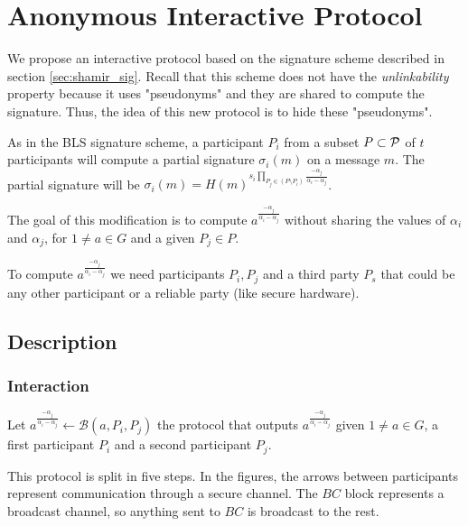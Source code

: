 \section{Anonymous Interactive Protocol}

We propose an interactive protocol based on the signature scheme described in section \ref{sec:shamir_sig}. Recall that this scheme does not have the \textit{unlinkability} property because it uses "pseudonyms" and they are shared to compute the signature. Thus, the idea of this new protocol is to hide these "pseudonyms".

As in the BLS signature scheme, a participant $P_i$ from a subset $P \subset {\mathcal P}$ of $t$ participants will compute a partial signature $\sigma_i (m)$ on a message $m$. The partial signature will be $\sigma_i (m) = H(m)^{s_i \prod_{P_j \in (P \setminus P_i)} \frac{-\alpha_j}{\alpha_i - \alpha_j}}$.

The goal of this modification is to compute $a^\frac{-\alpha_j}{\alpha_i - \alpha_j}$ without sharing the values of $\alpha_i$ and $\alpha_j$, for $1 \neq a \in G$ and a given $P_j \in P$.

To compute $a^\frac{-\alpha_j}{\alpha_i - \alpha_j}$ we need participants $P_i,P_j$ and a third party $P_s$ that could be any other participant or a reliable party (like secure hardware).

\subsection{Description}
\label{sec:inter}
\subsubsection*{Interaction}
Let $a^{\frac{-\alpha_j}{\alpha_i - \alpha_j}} \leftarrow \mathcal{B}(a,P_i,P_j)$ the protocol that outputs $a^{\frac{-\alpha_j}{\alpha_i - \alpha_j}}$ given $1 \neq a \in G$, a first participant $P_i$ and a second participant $P_j$.

This protocol is split in five steps. In the figures, the arrows between participants represent communication through a secure channel. The $BC$ block represents a broadcast channel, so anything sent to $BC$ is broadcast to the rest. 

